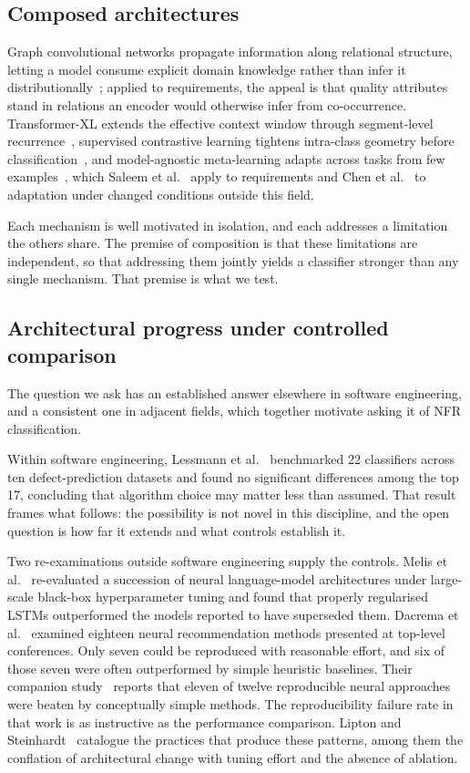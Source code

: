 \documentclass[11pt,a4paper]{article}
\begin{document}
\subsection{Composed architectures}
\label{sec:rw-composed}

Graph convolutional networks propagate information along relational structure, letting a model consume
explicit domain knowledge rather than infer it distributionally~\cite{liu2022,song2021}; applied to
requirements, the appeal is that quality attributes stand in relations an encoder would otherwise infer
from co-occurrence. Transformer-XL extends the effective context window through segment-level
recurrence~\cite{dai2019}, supervised contrastive learning tightens intra-class geometry before
classification~\cite{khosla2020}, and model-agnostic meta-learning adapts across tasks from few
examples~\cite{finn2017}, which Saleem et al.~\cite{saleem2025} apply to requirements and Chen et
al.~\cite{chen2025} to adaptation under changed conditions outside this field.

Each mechanism is well motivated in isolation, and each addresses a limitation the others
share. The premise of composition is that these limitations are independent, so that
addressing them jointly yields a classifier stronger than any single mechanism. That premise
is what we test.

\subsection{Architectural progress under controlled comparison}
\label{sec:rw-scrutiny}

The question we ask has an established answer elsewhere in software engineering, and a
consistent one in adjacent fields, which together motivate asking it of NFR classification.

Within software engineering, Lessmann et al.~\cite{lessmann2008} benchmarked 22 classifiers
across ten defect-prediction datasets and found no significant differences among the top 17,
concluding that algorithm choice may matter less than assumed. That result frames what
follows: the possibility is not novel in this discipline, and the open question is how far it
extends and what controls establish it.

Two re-examinations outside software engineering supply the controls. Melis et
al.~\cite{melis2018} re-evaluated a succession of neural language-model architectures under
large-scale black-box hyperparameter tuning and found that properly regularised LSTMs
outperformed the models reported to have superseded them. Dacrema et
al.~\cite{dacrema2019} examined eighteen neural recommendation methods presented at top-level conferences. Only seven could be reproduced with reasonable effort, and six of
those seven were often outperformed by simple heuristic baselines. Their companion
study~\cite{dacrema2021} reports that eleven of twelve reproducible neural approaches were
beaten by conceptually simple methods. The reproducibility failure rate in that work is as
instructive as the performance comparison. Lipton and Steinhardt~\cite{lipton2019}
catalogue the practices that produce these patterns, among them the conflation of
architectural change with tuning effort and the absence of ablation.
\end{document}
